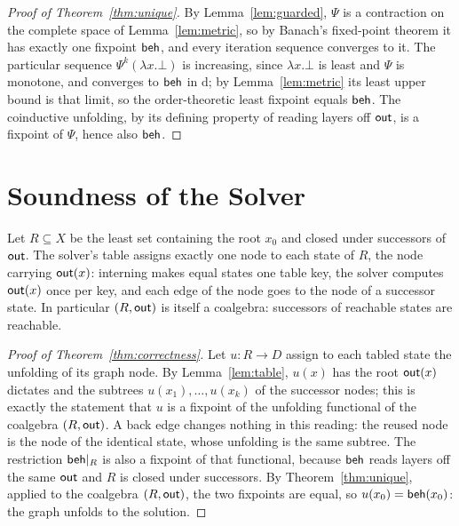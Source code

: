 \begin{proof}[Proof of Theorem~\ref{thm:unique}]
  By Lemma~\ref{lem:guarded}, $\Psi$ is a contraction on the complete space of
  Lemma~\ref{lem:metric}, so by Banach's fixed-point theorem \cite{banach1922-operations} it has exactly
  one fixpoint $\mathsf{beh}$, and every iteration sequence converges to it. The particular
  sequence $\Psi^k(\lambda x.\bot)$ is increasing, since $\lambda x.\bot$ is least and $\Psi$
  is monotone, and converges to $\mathsf{beh}$ in $\mathrm{d}$; by Lemma~\ref{lem:metric} its least
  upper bound is that limit, so the order-theoretic least fixpoint equals $\mathsf{beh}$. The
  coinductive unfolding, by its defining property of reading layers off $\mathsf{out}$, is a
  fixpoint of $\Psi$, hence also $\mathsf{beh}$.
\end{proof}

\section{Soundness of the Solver}\label{app:correctness}
\begin{lemma}\label{lem:table}
  Let $R \subseteq X$ be the least set containing the root $x_0$ and closed under successors
  of $\mathsf{out}$. The solver's table assigns exactly one node to each state of $R$, the node
  carrying $\mathsf{out}(x)$: interning makes equal states one table key, the solver computes
  $\mathsf{out}(x)$ once per key, and each edge of the node goes to the node of a successor state.
  In particular $(R, \mathsf{out})$ is itself a coalgebra: successors of reachable states are
  reachable.
\end{lemma}

\begin{proof}[Proof of Theorem~\ref{thm:correctness}]
  Let $u \colon R \to D$ assign to each tabled state the unfolding of its graph node. By
  Lemma~\ref{lem:table}, $u(x)$ has the root $\mathsf{out}(x)$ dictates and the subtrees
  $u(x_1), \dots, u(x_k)$ of the successor nodes; this is exactly the statement that $u$ is a
  fixpoint of the unfolding functional of the coalgebra $(R, \mathsf{out})$. A back edge changes
  nothing in this reading: the reused node is the node of the identical state, whose
  unfolding is the same subtree. The restriction $\mathsf{beh}|_R$ is also a fixpoint of that
  functional, because $\mathsf{beh}$ reads layers off the same $\mathsf{out}$ and $R$ is closed under
  successors. By Theorem~\ref{thm:unique}, applied to the coalgebra $(R, \mathsf{out})$, the two
  fixpoints are equal, so $u(x_0) = \mathsf{beh}(x_0)$: the graph unfolds to the solution.
\end{proof}

